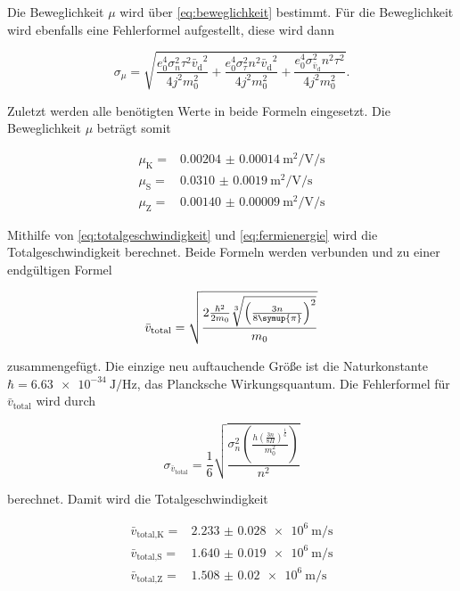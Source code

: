 Die Beweglichkeit $\mu$ wird über \autoref{eq:beweglichkeit} bestimmt.
Für die Beweglichkeit wird ebenfalls eine Fehlerformel aufgestellt, diese wird dann

\begin{equation}
    \sigma _{\mu} = \sqrt{\frac{e_{0}^{4} \sigma_{n}^{2} \tau^{2} {\bar{v}_\text{d}}^{2}}{4 j^{2} m_{0}^{2}} + \frac{e_{0}^{4} \sigma_{\tau}^{2} n^{2} {\bar{v}_\text{d}}^{2}}{4 j^{2} m_{0}^{2}} + \frac{e_{0}^{4} \sigma_{\bar{v}_\text{d}}^{2} n^{2} \tau^{2}}{4 j^{2} m_{0}^{2}}}.
    \label{eq:bewegl_fehler}
\end{equation}

Zuletzt werden alle benötigten Werte in beide Formeln eingesetzt.
Die Beweglichkeit $\mu$ beträgt somit

\begin{align*}
    \mu _\text{K} =& \SI{0.00204(14)}{\meter\squared\per\volt\per\second}\\
    \mu _\text{S} =& \SI{0.0310(19)}{\meter\squared\per\volt\per\second}\\
    \mu _\text{Z} =& \SI{0.00140(9)}{\meter\squared\per\volt\per\second}
\end{align*}

Mithilfe von \autoref{eq:totalgeschwindigkeit} und \autoref{eq:fermienergie} wird die Totalgeschwindigkeit berechnet.
Beide Formeln werden verbunden und zu einer endgültigen Formel

\begin{equation}
    \bar{v}_\text{total} = \sqrt{\frac{2 \frac{\hbar^2}{2 m_0}\sqrt[3]{\left(\frac{3n}{8\symup{\pi}}\right)^2}}{m_0}}
    \label{eq:totalgeschw.}
\end{equation}

zusammengefügt.
Die einzige neu auftauchende Größe ist die Naturkonstante $\hbar = \SI{6.63e-34}{\joule\per\hertz}$, das Plancksche Wirkungsquantum.\cite{physics_constants}
Die Fehlerformel für $\bar{v}_\text{total}$ wird durch 

\begin{equation}
    \sigma _{\bar{v}_\text{total}} = \frac{1}{6}  \sqrt{\frac{\sigma_{n}^{2} \left(\frac{h \left(\frac{3 n}{8 \Pi}\right)^{\frac{1}{6}}}{m_{0}^{2}}\right)}{n^{2}}}
    \label{eq:totalgeschw._fehler}
\end{equation}

berechnet.
Damit wird die Totalgeschwindigkeit

\begin{align*}
    \bar{v}_\text{total,K} =& \SI{2.233(28)e6}{\meter\per\second}\\
    \bar{v}_\text{total,S} =& \SI{1.640(19)e6}{\meter\per\second}\\
    \bar{v}_\text{total,Z} =& \SI{1.508(20)e6}{\meter\per\second}
\end{align*}

